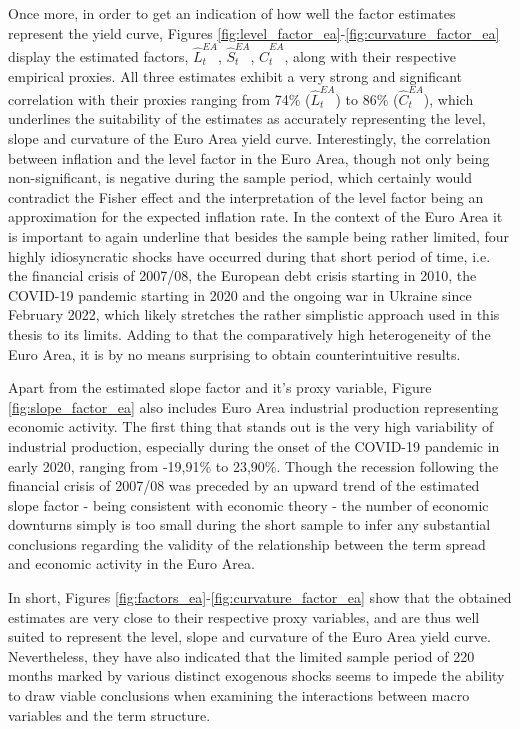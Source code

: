 Once more, in order to get an indication of how well the factor estimates represent the yield curve, Figures \ref{fig:level_factor_ea}-\ref{fig:curvature_factor_ea} display the estimated factors, $\hat{L}^{EA}_{t}$, $\hat{S}^{EA}_{t}$, $\hat{C}^{EA}_{t}$, along with their respective empirical proxies. 
All three estimates exhibit a very strong and significant correlation with their proxies ranging from 74\% ($\hat{L}^{EA}_{t}$) to 86\% ($\hat{C}^{EA}_{t}$), which underlines the suitability of the estimates as accurately representing the level, slope and curvature of the Euro Area yield curve. 
Interestingly, the correlation between inflation and the level factor in the Euro Area, though not only being non-significant, is negative during the sample period, which certainly would contradict the Fisher effect and the interpretation of the level factor being an approximation for the expected inflation rate. 
In the context of the Euro Area it is important to again underline that besides the sample being rather limited, four highly idiosyncratic shocks have occurred during that short period of time, i.e. the financial crisis of 2007/08, the European debt crisis starting in 2010, the COVID-19 pandemic starting in 2020 and the ongoing war in Ukraine since February 2022, which likely stretches the rather simplistic approach used in this thesis to its limits. Adding to that the comparatively high heterogeneity of the Euro Area, it is by no means surprising to obtain counterintuitive results. 

Apart from the estimated slope factor and it's proxy variable, Figure \ref{fig:slope_factor_ea} also includes Euro Area industrial production representing economic activity. The first thing that stands out is the very high variability of industrial production, especially during the onset of the COVID-19 pandemic in early 2020, ranging from -19,91\% to 23,90\%. 
Though the recession following the financial crisis of 2007/08 was preceded by an upward trend of the estimated slope factor - being consistent with economic theory - the number of economic downturns simply is too small during the short sample to infer any substantial conclusions regarding the validity of the relationship between the term spread and economic activity in the Euro Area.

In short, Figures \ref{fig:factors_ea}-\ref{fig:curvature_factor_ea} show that the obtained estimates are very close to their respective proxy variables, and are thus well suited to represent the level, slope and curvature of the Euro Area yield curve. Nevertheless, they have also indicated that the limited sample period of 220 months marked by various distinct exogenous shocks seems to impede the ability to draw viable conclusions when examining the interactions between macro variables and the term structure.  



